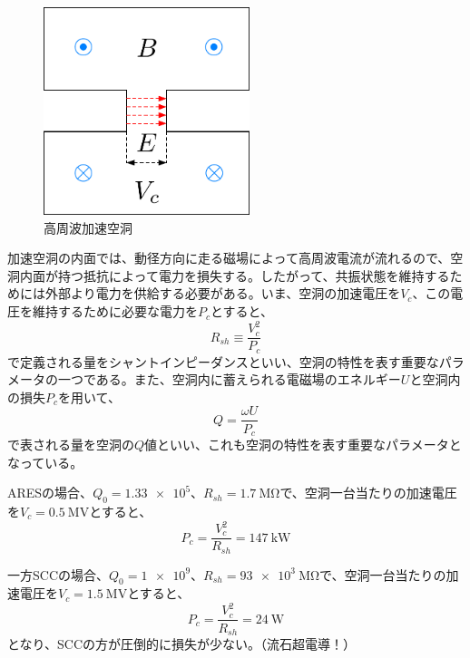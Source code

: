 \documentclass[10pt,a4paper]{ltjsarticle}
\begin{document}
\begin{figure}[hbt]
  \begin{center}
    \includegraphics[width=6cm,clip]{cavity3.pdf}
    \caption{高周波加速空洞}
   \label{cavity3}
  \end{center}
\end{figure}

加速空洞の内面では、動径方向に走る磁場によって高周波電流が流れるので、空洞内面が持つ抵抗によって電力を損失する。したがって、共振状態を維持するためには外部より電力を供給する必要がある。いま、空洞の加速電圧を$V_{c}$、この電圧を維持するために必要な電力を$P_{c}$とすると、
%
\begin{equation}
  R_{sh} \equiv \frac{V_{c}^2}{P_{c}}
  \label{sh}
\end{equation}
%
で定義される量をシャントインピーダンスといい、空洞の特性を表す重要なパラメータの一つである。また、空洞内に蓄えられる電磁場のエネルギー$U$と空洞内の損失$P_{c}$を用いて、
%
\begin{equation}
  Q = \frac{\omega U}{P_{c}}
  \label{q_val}
\end{equation}
%
で表される量を空洞の$Q$値といい、これも空洞の特性を表す重要なパラメータとなっている。

\begin{tcolorbox}[title=\textgt{ARESとSCCの空洞損失}]
  ARESの場合、$Q_{0}=\num{1.33e5}$、$R_{sh}=\SI{1.7}{\mega \ohm}$で、空洞一台当たりの加速電圧を$V_{c}=\SI{0.5}{\mega\volt}$とすると、
%
\begin{equation*}
  P_{c} = \frac{V_{c}^2}{R_{sh}}=\SI{147}{\kilo \watt}
\end{equation*}

一方SCCの場合、$Q_{0}=\num{1e9}$、$R_{sh}=\SI{93e3}{\mega\ohm}$で、空洞一台当たりの加速電圧を$V_{c}=\SI{1.5}{\mega\volt}$とすると、
%
\begin{equation*}
  P_{c} = \frac{V_{c}^2}{R_{sh}}=\SI{24}{\watt}
\end{equation*}
%
となり、SCCの方が圧倒的に損失が少ない。（流石超電導！）
\end{tcolorbox}
\end{document}
